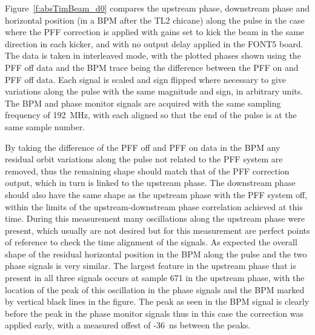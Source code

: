 Figure~\ref{f:absTimBeam_d0} compares the upstream phase, downstream phase and horizontal position (in a BPM after the TL2 chicane) along the pulse in the case where the PFF correction is applied with gains set to kick the beam in the same direction in each kicker, and with no output delay applied in the FONT5 board. The data is taken in interleaved mode, with the plotted phases shown using the PFF off data and the BPM trace being the difference between the PFF on and PFF off data. Each signal is scaled and sign flipped where necessary to give variations along the pulse with the same magnitude and sign, in arbitrary units. The BPM and phase monitor signals are acquired with the same sampling frequency of 192~MHz, with each aligned so that the end of the pulse is at the same sample number. 

By taking the difference of the PFF off and PFF on data in the BPM any residual orbit variations along the pulse not related to the PFF system are removed, thus the remaining shape should match that of the PFF correction output, which in turn is linked to the upstream phase. The downstream phase should also have the same shape as the upstream phase with the PFF system off, within the limits of the upstream-downstream phase correlation achieved at this time. During this measurement many oscillations along the upstream phase were present, which usually are not desired but for this measurement are perfect points of reference to check the time alignment of the signals. As expected the overall shape of the residual horizontal position in the BPM along the pulse and the two phase signals is very similar. The largest feature in the upstream phase that is present in all three signals occurs at sample 671 in the upstream phase, with the location of the peak of this oscillation in the phase signals and the BPM marked by vertical black lines in the figure. The peak as seen in the BPM signal is clearly before the peak in the phase monitor signals thus in this case the correction was applied early, with a measured offest of -36~ns between the peaks.

